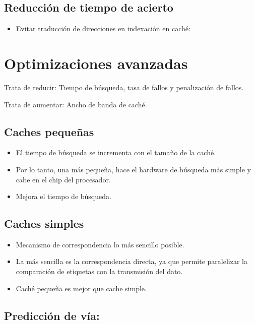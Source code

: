 \documentclass[12pt, twoside, openright]{report} %
\begin{document}
\subsection{Reducción de tiempo de acierto}

\begin{itemize}

	\item Evitar traducción de direcciones en indexación en caché:
\end{itemize}

\section{Optimizaciones avanzadas}

Trata de reducir: Tiempo de búsqueda, tasa de fallos y penalización
de fallos.

Trata de aumentar: Ancho de banda de caché.

\subsection{Caches pequeñas}

\begin{itemize}

	\item El tiempo de búsqueda se incrementa con el tamaño de la caché.
	\item Por lo tanto, una más pequeña, hace el hardware de búsqueda más
	      simple y cabe en el chip del procesador.
	\item Mejora el tiempo de búsqueda.
\end{itemize}

\subsection{Caches simples}

\begin{itemize}

	\item Mecanismo de correspondencia lo más sencillo posible.
	\item La más sencilla es la correspondencia directa, ya que permite
	      paralelizar la comparación de etiquetas con la transmisión del
	      dato.
	\item Caché pequeña es mejor que cache simple.
\end{itemize}
\subsection{Predicción de vía:}
\end{document}
